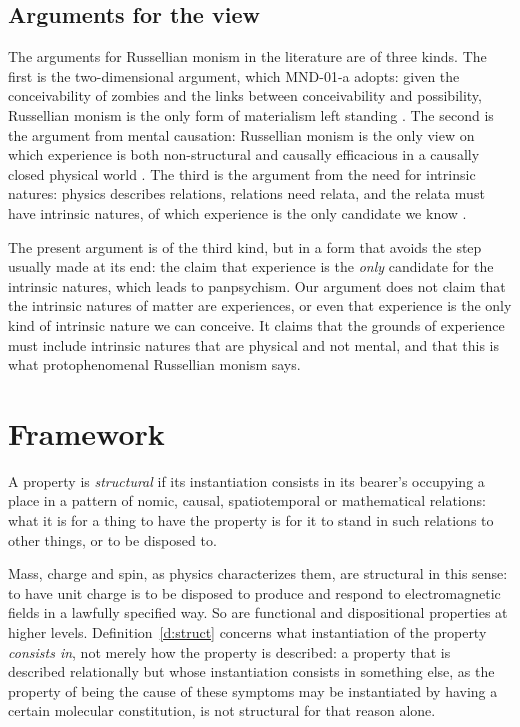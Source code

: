 \documentclass{situationist-preprint}
\begin{document}
\subsection{Arguments for the view}

The arguments for Russellian monism in the literature are of three kinds. The first is the two-dimensional argument, which MND-01-a adopts: given the conceivability of zombies and the links between conceivability and possibility, Russellian monism is the only form of materialism left standing \citep{Chalmers2009}. The second is the argument from mental causation: Russellian monism is the only view on which experience is both non-structural and causally efficacious in a causally closed physical world \citep{Chalmers1996}. The third is the argument from the need for intrinsic natures: physics describes relations, relations need relata, and the relata must have intrinsic natures, of which experience is the only candidate we know \citep{Russell1927,Strawson2006}.

The present argument is of the third kind, but in a form that avoids the step usually made at its end: the claim that experience is the \emph{only} candidate for the intrinsic natures, which leads to panpsychism. Our argument does not claim that the intrinsic natures of matter are experiences, or even that experience is the only kind of intrinsic nature we can conceive. It claims that the grounds of experience must include intrinsic natures that are physical and not mental, and that this is what protophenomenal Russellian monism says.

\section{Framework}\label{s:frame}

\begin{definition}\label{d:struct}
A property is \emph{structural} if its instantiation consists in its bearer's occupying a place in a pattern of nomic, causal, spatiotemporal or mathematical relations: what it is for a thing to have the property is for it to stand in such relations to other things, or to be disposed to.
\end{definition}

Mass, charge and spin, as physics characterizes them, are structural in this sense: to have unit charge is to be disposed to produce and respond to electromagnetic fields in a lawfully specified way. So are functional and dispositional properties at higher levels. Definition~\ref{d:struct} concerns what instantiation of the property \emph{consists in}, not merely how the property is described: a property that is described relationally but whose instantiation consists in something else, as the property of being the cause of these symptoms may be instantiated by having a certain molecular constitution, is not structural for that reason alone.
\end{document}
